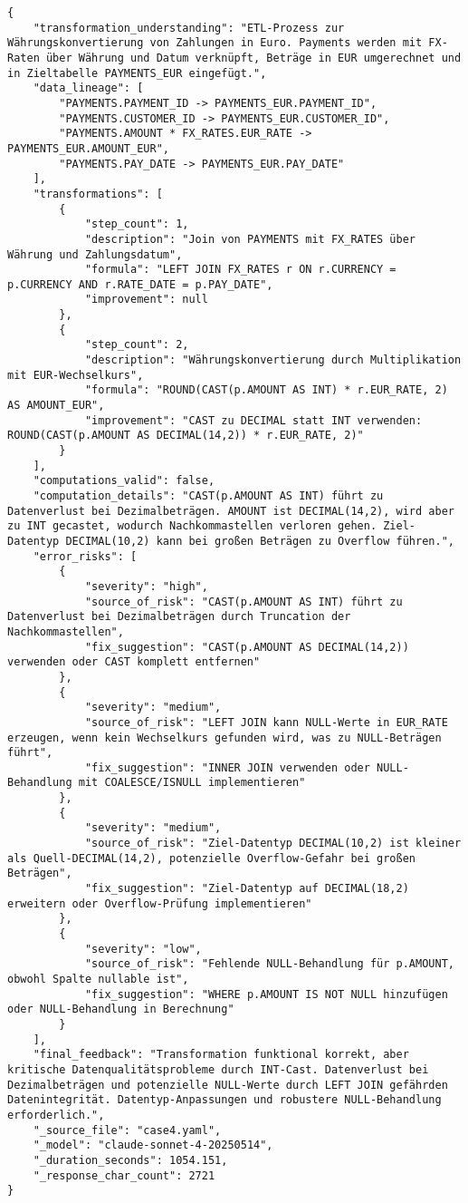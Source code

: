 \begin{lstlisting}[caption={Ausgabe: Claude Sonnet 4 Anwendungsfall 4 Hauptdurchlauf},label={claude_case4_prompt1}]
{
    "transformation_understanding": "ETL-Prozess zur Währungskonvertierung von Zahlungen in Euro. Payments werden mit FX-Raten über Währung und Datum verknüpft, Beträge in EUR umgerechnet und in Zieltabelle PAYMENTS_EUR eingefügt.",
    "data_lineage": [
        "PAYMENTS.PAYMENT_ID -> PAYMENTS_EUR.PAYMENT_ID",
        "PAYMENTS.CUSTOMER_ID -> PAYMENTS_EUR.CUSTOMER_ID",
        "PAYMENTS.AMOUNT * FX_RATES.EUR_RATE -> PAYMENTS_EUR.AMOUNT_EUR",
        "PAYMENTS.PAY_DATE -> PAYMENTS_EUR.PAY_DATE"
    ],
    "transformations": [
        {
            "step_count": 1,
            "description": "Join von PAYMENTS mit FX_RATES über Währung und Zahlungsdatum",
            "formula": "LEFT JOIN FX_RATES r ON r.CURRENCY = p.CURRENCY AND r.RATE_DATE = p.PAY_DATE",
            "improvement": null
        },
        {
            "step_count": 2,
            "description": "Währungskonvertierung durch Multiplikation mit EUR-Wechselkurs",
            "formula": "ROUND(CAST(p.AMOUNT AS INT) * r.EUR_RATE, 2) AS AMOUNT_EUR",
            "improvement": "CAST zu DECIMAL statt INT verwenden: ROUND(CAST(p.AMOUNT AS DECIMAL(14,2)) * r.EUR_RATE, 2)"
        }
    ],
    "computations_valid": false,
    "computation_details": "CAST(p.AMOUNT AS INT) führt zu Datenverlust bei Dezimalbeträgen. AMOUNT ist DECIMAL(14,2), wird aber zu INT gecastet, wodurch Nachkommastellen verloren gehen. Ziel-Datentyp DECIMAL(10,2) kann bei großen Beträgen zu Overflow führen.",
    "error_risks": [
        {
            "severity": "high",
            "source_of_risk": "CAST(p.AMOUNT AS INT) führt zu Datenverlust bei Dezimalbeträgen durch Truncation der Nachkommastellen",
            "fix_suggestion": "CAST(p.AMOUNT AS DECIMAL(14,2)) verwenden oder CAST komplett entfernen"
        },
        {
            "severity": "medium",
            "source_of_risk": "LEFT JOIN kann NULL-Werte in EUR_RATE erzeugen, wenn kein Wechselkurs gefunden wird, was zu NULL-Beträgen führt",
            "fix_suggestion": "INNER JOIN verwenden oder NULL-Behandlung mit COALESCE/ISNULL implementieren"
        },
        {
            "severity": "medium",
            "source_of_risk": "Ziel-Datentyp DECIMAL(10,2) ist kleiner als Quell-DECIMAL(14,2), potenzielle Overflow-Gefahr bei großen Beträgen",
            "fix_suggestion": "Ziel-Datentyp auf DECIMAL(18,2) erweitern oder Overflow-Prüfung implementieren"
        },
        {
            "severity": "low",
            "source_of_risk": "Fehlende NULL-Behandlung für p.AMOUNT, obwohl Spalte nullable ist",
            "fix_suggestion": "WHERE p.AMOUNT IS NOT NULL hinzufügen oder NULL-Behandlung in Berechnung"
        }
    ],
    "final_feedback": "Transformation funktional korrekt, aber kritische Datenqualitätsprobleme durch INT-Cast. Datenverlust bei Dezimalbeträgen und potenzielle NULL-Werte durch LEFT JOIN gefährden Datenintegrität. Datentyp-Anpassungen und robustere NULL-Behandlung erforderlich.",
    "_source_file": "case4.yaml",
    "_model": "claude-sonnet-4-20250514",
    "_duration_seconds": 1054.151,
    "_response_char_count": 2721
}
\end{lstlisting}

